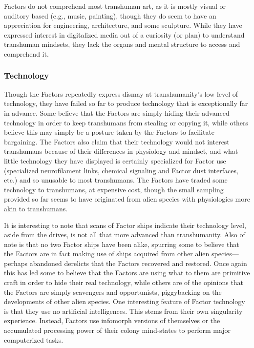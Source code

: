 Factors do not comprehend most transhuman art, as it is mostly visual or auditory based (e.g., music, painting), though they do seem to have an appreciation for engineering, architecture, and some sculpture. While they have expressed interest in digitalized media out of a curiosity (or plan) to understand transhuman mindsets, they lack the organs and mental structure to access and comprehend it. 

\subsubsection{Technology} 

Though the Factors repeatedly express dismay at transhumanity's low level of technology, they have failed so far to produce technology that is exceptionally far in advance. Some believe that the Factors are simply hiding their advanced technology in order to keep transhumans from stealing or copying it, while others believe this may simply be a posture taken by the Factors to facilitate bargaining. The Factors also claim that their technology would not interest transhumans because of their differences in physiology and mindset, and what little technology they have displayed is certainly specialized for Factor use (specialized neurofilament links, chemical signaling and Factor dust interfaces, etc.) and so unusable to most transhumans. The Factors have traded some technology to transhumans, at expensive cost, though the small sampling provided so far seems to have originated from alien species with physiologies more akin to transhumans. 

It is interesting to note that scans of Factor ships indicate their technology level, aside from the drives, is not all that more advanced than transhumanity. Also of note is that no two Factor ships have been alike, spurring some to believe that the Factors are in fact making use of ships acquired from other alien species—perhaps abandoned derelicts that the Factors recovered and restored. Once again this has led some to believe that the Factors are using what to them are primitive craft in order to hide their real technology, while others are of the opinions that the Factors are simply scavengers and opportunists, piggybacking on the developments of other alien species. One interesting feature of Factor technology is that they use no artificial intelligences. This stems from their own singularity experience. Instead, Factors use infomorph versions of themselves or the accumulated processing power of their colony mind-states to perform major computerized tasks. 


